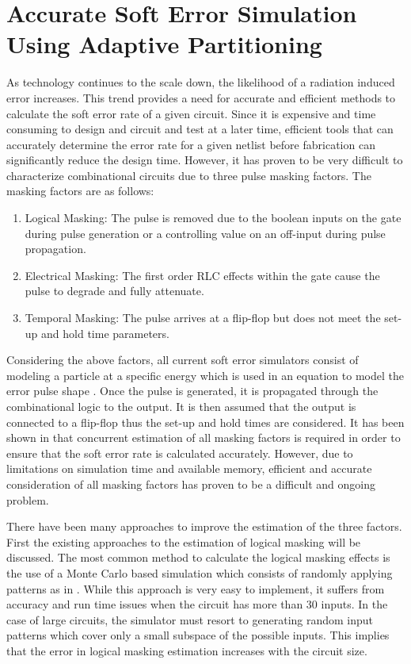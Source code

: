 \chapter{Accurate Soft Error Simulation Using Adaptive Partitioning} 

As technology continues to the scale down, the likelihood of a radiation induced error increases. This trend provides a need for accurate and efficient methods to calculate the soft error rate of a given circuit. Since it is expensive and time consuming to design and circuit and test at a later time, efficient tools that can accurately determine the error rate for a given netlist before fabrication can significantly reduce the design time. However, it has proven to be very difficult to characterize combinational circuits due to three pulse masking factors. The masking factors are as follows:

\begin{enumerate}
	\item Logical Masking: The pulse is removed due to the boolean inputs on the gate during pulse generation or a controlling value on an off-input during pulse propagation.
	
	\item Electrical Masking: The first order RLC effects within the gate cause the pulse to degrade and fully attenuate.
	
	\item Temporal Masking: The pulse arrives at a flip-flop but does not meet the set-up and hold time parameters. 
\end{enumerate}

Considering the above factors, all current soft error simulators consist of modeling a particle at a specific energy which is used in an equation to model the error pulse shape \cite{injeq}. Once the pulse is generated, it is propagated through the combinational logic to the output. It is then assumed that the output is connected to a flip-flop thus the set-up and hold times are considered. It has been shown in \cite{MARS_C,METSys} that concurrent estimation of all masking factors is required in order to ensure that the soft error rate is calculated accurately. However, due to limitations on simulation time and available memory, efficient and accurate consideration of all masking factors has proven to be a difficult and ongoing problem. 

There have been many approaches to improve the estimation of the three factors. First the existing approaches to the estimation of logical masking will be discussed. The most common method to calculate the logical masking effects is the use of a Monte Carlo based simulation which consists of randomly applying patterns as in \cite{Accurate_Masking,SERA,SEMM,PARAM_DESC,SETA_LA}. While this approach is very easy to implement, it suffers from accuracy and run time issues when the circuit has more than 30 inputs. In the case of large circuits, the simulator must resort to generating random input patterns which cover only a small subspace of the possible inputs. This implies that the error in logical masking estimation increases with the circuit size. 

